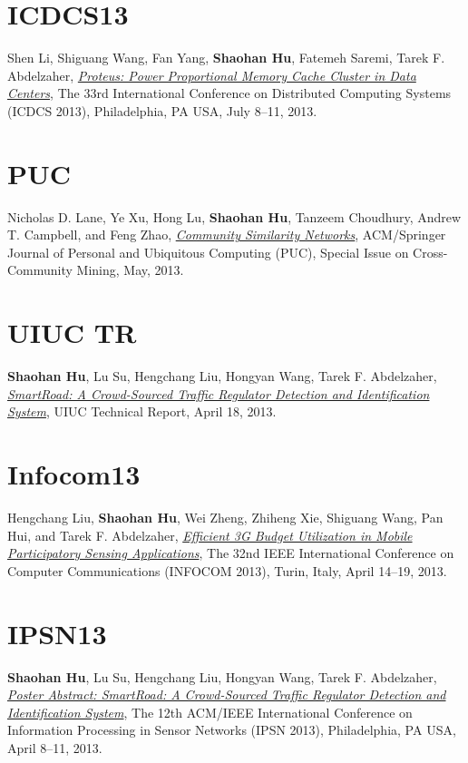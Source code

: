 \section{\sc ICDCS13}\hypertarget{li2013icdcs}{}
Shen Li, Shiguang Wang, Fan Yang, \textbf{Shaohan Hu}, Fatemeh Saremi,
Tarek F. Abdelzaher, \href{http://ieeexplore.ieee.org/xpl/articleDetails.jsp?arnumber=6681577}{\emph{Proteus: Power Proportional Memory Cache
  Cluster in Data Centers}}, \textsf{The 33rd International Conference
  on Distributed Computing Systems (ICDCS 2013)}, Philadelphia, PA USA,
July 8--11, 2013.

\section{\sc PUC}\hypertarget{lane2013puc}{}
Nicholas D. Lane, Ye Xu, Hong Lu, \textbf{Shaohan Hu}, Tanzeem
Choudhury, Andrew T. Campbell, and Feng Zhao, \href{http://link.springer.com/article/10.1007/s00779-013-0655-1}{\emph{Community Similarity Networks}}, \textsf{ACM/Springer Journal of Personal
  and Ubiquitous Computing (PUC), Special Issue on Cross-Community
  Mining}, May, 2013.

\section{\sc UIUC TR}\hypertarget{hu2013uiuc1}{}
\textbf{Shaohan Hu}, Lu Su, Hengchang Liu, Hongyan Wang, Tarek F.
Abdelzaher, \href{https://www.ideals.illinois.edu/handle/2142/43856}{\emph{SmartRoad: A Crowd-Sourced Traffic Regulator
  Detection and Identification System}}, \textsf{UIUC Technical
  Report}, April 18, 2013.

\section{\sc Infocom13}\hypertarget{liu2013infocom}{}
Hengchang Liu, \textbf{Shaohan Hu}, Wei Zheng, Zhiheng Xie, Shiguang
Wang, Pan Hui, and Tarek F. Abdelzaher, \href{http://ieeexplore.ieee.org/xpl/articleDetails.jsp?arnumber=6566935}{\emph{Efficient 3G Budget
  Utilization in Mobile Participatory Sensing Applications}},
\textsf{The 32nd IEEE International Conference on Computer
  Communications (INFOCOM 2013)}, Turin, Italy, April 14--19, 2013.

\section{\sc IPSN13}\hypertarget{hu2013ipsn}{}
\textbf{Shaohan Hu}, Lu Su, Hengchang Liu, Hongyan Wang, Tarek F.
Abdelzaher, \href{http://portal.acm.org/citation.cfm?id=2461433}{\emph{Poster Abstract: SmartRoad: A Crowd-Sourced Traffic
  Regulator Detection and Identification System}}, \textsf{The 12th
  ACM/IEEE International Conference on Information Processing in
  Sensor Networks (IPSN 2013)}, Philadelphia, PA USA, April 8--11, 2013.

